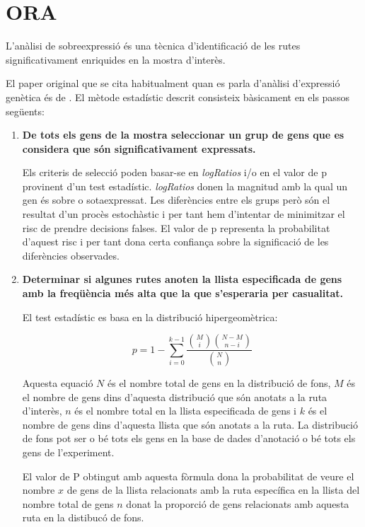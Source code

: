 \section{\gls{ORA}}

L'anàlisi de sobreexpressió és una tècnica d'identificació de les rutes significativament enriquides en la mostra d'interès. 

El paper original que se cita habitualment quan es parla d'anàlisi d'expressió genètica és de \cite{boyle2004go}. El mètode estadístic descrit consisteix bàsicament en els passos següents:

\begin{enumerate}
\item \textbf{De tots els gens de la mostra seleccionar un grup de gens que es considera que són significativament expressats.}

Els criteris de selecció poden basar-se en \textit{\gls{logRatio}s} i/o en el valor de p provinent d'un test estadístic. \textit{\gls{logRatio}s} donen la magnitud amb la qual un gen és sobre o sotaexpressat. Les diferències entre els grups però són el resultat d'un procès estochàstic i per tant hem d'intentar de minimitzar el risc de prendre decisions falses. El valor de p representa la probabilitat d'aquest risc i per tant dona certa confiança sobre la significació de les diferències observades.

\item \textbf{Determinar si algunes rutes anoten la llista especificada de gens amb la freqüència més alta que la que s’esperaria per casualitat.} 

El test estadístic es basa en la distribució hipergeomètrica: 

$$p = 1 - \displaystyle\sum_{i = 0}^{k-1}\frac{{M \choose i}{{N-M} \choose {n-i}}} {{N \choose n}}$$

Aquesta equació $N$ és el nombre total de gens en la distribució de fons, $M$ és el nombre de gens dins d'aquesta distribució que són anotats a la ruta d'interès, $n$ és el nombre total en la llista especificada de gens i $k$ és el nombre de gens dins d'aquesta llista que són anotats a la ruta. La distribució de fons pot ser o bé tots els gens en la base de dades d'anotació o bé tots els gens de l'experiment.

El valor de P obtingut amb aquesta fòrmula dona la probabilitat de veure el nombre $x$ de gens de la llista relacionats amb la ruta específica en la llista del nombre total de gens $n$ donat la proporció de gens relacionats amb aquesta ruta en la distibucó de fons.
\end{enumerate}


